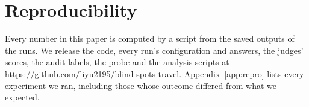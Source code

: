 \documentclass[11pt,a4paper,twocolumn]{article}
\begin{document}
\section*{Reproducibility}

Every number in this paper is computed by a script from the saved outputs of the runs. We release the code, every run's configuration and answers, the judges' scores, the audit labels, the probe and the analysis scripts at \url{https://github.com/liyu2195/blind-spots-travel}. Appendix~\ref{app:repro} lists every experiment we ran, including those whose outcome differed from what we expected.




\clearpage
\appendix

\end{document}
